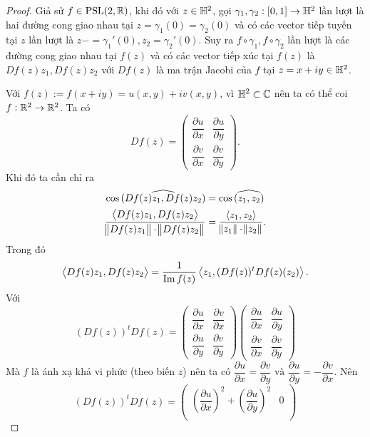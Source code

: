\begin{proof}
    Giả sử $f \in \operatorname{PSL}(2,\mathbb{R})$, khi đó với $z \in \mathbb{H}^2$, gọi $\gamma_1, \gamma_2: [0,1] \to \mathbb{H}^2$ lần lượt là hai đường cong giao nhau tại $z=\gamma_1(0)= \gamma_2(0)$ và có các vector tiếp tuyến tại $z$ lần lượt là $z-= \gamma_1'(0), z_2 =\gamma_2'(0)$. Suy ra $f\circ \gamma_1, f\circ \gamma_2$ lần lượt là các đường cong giao nhau tại $f(z)$ và có các vector tiếp xúc tại $f(z)$ là $Df(z)z_1,Df(z)z_2$ với $Df(z)$ là ma trận Jacobi của $f$ tại $z=x+iy \in \mathbb{H}^2$. 
    
    Với $f(z) := f(x+iy) = u(x,y) + iv(x,y)$, vì $\mathbb{H}^2 \subset \mathbb{C}$ nên ta có thể coi $f: \mathbb{R}^2 \to \mathbb{R}^2$. Ta có 
    \[Df(z) = \begin{pmatrix}
                \dfrac{\partial u}{\partial x} & \dfrac{\partial u}{\partial y} \\
                 \dfrac{\partial v}{\partial x}& \dfrac{\partial v}{\partial y}
            \end{pmatrix}.\]
    Khi đó ta cần chỉ ra 
    \begin{align*}
         \cos\widehat{(Df(z)z_1,Df(z)z_2)} &= \cos\widehat{(z_1,z_2)}\\
         \dfrac{\left<Df(z)z_1,Df(z)z_2\right>}{\norm{Df(z)z_1}\cdot \norm{Df(z)z_2}} &= \dfrac{\left<z_1,z_2\right>}{\norm{z_1}\cdot \norm{z_2}}.
    \end{align*}
    Trong đó \[\left<Df(z)z_1,Df(z)z_2\right> = \dfrac{1}{\operatorname{Im} f(z)} \left<z_1,(Df(z))^tDf(z)(z_2)\right>.\]
    Với 
    \[(Df(z))^tDf(z) = \begin{pmatrix}
                \dfrac{\partial u}{\partial x} & \dfrac{\partial v}{\partial x} \\
                 \dfrac{\partial u}{\partial y}& \dfrac{\partial v}{\partial y}
            \end{pmatrix} \begin{pmatrix}
                \dfrac{\partial u}{\partial x} & \dfrac{\partial u}{\partial y} \\
                 \dfrac{\partial v}{\partial x}& \dfrac{\partial v}{\partial y}
            \end{pmatrix}\]        
    Mà $f$ là ánh xạ khả vi phức (theo biến $z$) nên ta có $\dfrac{\partial u}{\partial x} = \dfrac{\partial v}{\partial y} \text{ và } \dfrac{\partial u}{\partial y} = -\dfrac{\partial v}{\partial x}$. Nên 
    \[(Df(z))^tDf(z) = \begin{pmatrix}
                \left(\dfrac{\partial u}{\partial x}\right)^2  + \left(\dfrac{\partial u}{\partial y}\right)^2 & 0 \\

\end{pmatrix}\]
\end{proof}
